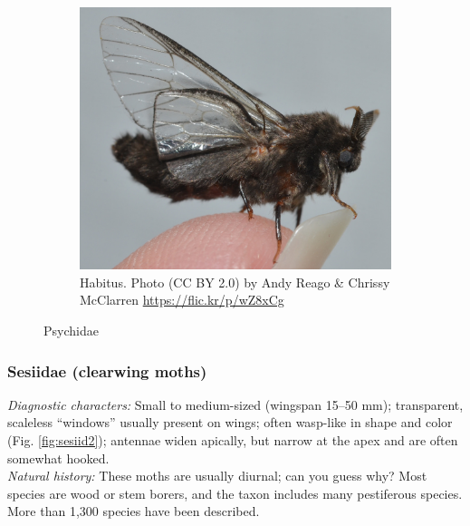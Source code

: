 \documentclass[letterpaper, 11pt]{article}
\begin{document}
\begin{figure}[ht!]
\begin{subfigure}[ht!]{0.35\textwidth}
        \includegraphics[width=\textwidth]{PsychidHabitus}
        \caption{Habitus. Photo (CC BY 2.0) by Andy Reago \& Chrissy McClarren \url{https://flic.kr/p/wZ8xCg}}
        \label{fig:psychid3}
    \end{subfigure}
    \caption{Psychidae}\label{fig:psychids}
\end{figure}

\subsubsection{Sesiidae (clearwing moths)}
\noindent{}\textit{Diagnostic characters:} Small to medium-sized (wingspan 15--50 mm); transparent, scaleless ``windows'' usually present on wings; often wasp-like in shape and color (Fig. \ref{fig:sesiid2}); antennae widen apically, but narrow at the apex and are often somewhat hooked.\\

\noindent{}\textit{Natural history:} These moths are usually diurnal; can you guess why? Most species are wood or stem borers, and the taxon includes many pestiferous species. More than 1,300 species have been described.
\end{document}
